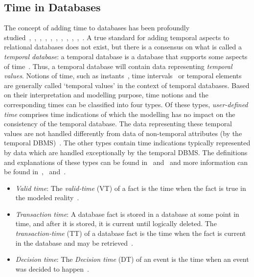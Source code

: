 %
%




\subsection{\label{subsec:time-in-databases}Time in Databases}
The concept of adding time to databases has been profoundly studied~\cite{Darwen1998},~\cite{Etzion1998},~\cite{Etzion1998b},~\cite{Gal1998},~\cite{Jensen1999},~\cite{Lomet2006},~\cite{Nascimento1995},~\cite{Sarda1990},~\cite{Snodgrass1998},~\cite{Toman1998},~\cite{Wu1998}. A true standard for adding temporal aspects to relational databases does not exist, but there is a consensus on what is called a \emph{temporal database}: a temporal database is a database that supports some aspects of time~\cite{Dyreson1994}. Thus, a temporal database will contain data representing \emph{temporal values}. Notions of time, such as instants~\cite{Dyreson1994}, time intervals~\cite{Dyreson1994} or temporal elements~\cite{Dyreson1994} are generally called `temporal values' in the context of temporal databases. Based on their interpretation and modelling purpose, time notions and the corresponding times can be classified into four types. Of these types, \emph{user-defined time} comprises time indications of which the modelling has no impact on the consistency of the temporal database. The data representing these temporal values are not handled differently from data of non-temporal attributes (by the temporal DBMS)~\cite{Dyreson1994}. The other types contain time indications typically represented by data which are handled exceptionally by the temporal DBMS. The definitions and explanations of these types can be found in~\cite{Dyreson1994} and~\cite{Nascimento1995} and more information can be found in~\cite{Jensen1991},~\cite{Snodgrass1984} and~\cite{Nascimento1995}.

\begin{itemize}
	\item \emph{Valid time}: The \emph{valid-time} (VT) of a fact is the time when the fact is true in the modeled reality~\cite{Dyreson1994}.
	\item \emph{Transaction time}: A database fact is stored in a database at some point in time, and after it is stored, it is current until logically deleted. The \emph{transaction-time} (TT) of a database fact is the time when the fact is current in the database and may be retrieved~\cite{Dyreson1994}.
	\item \emph{Decision time}: The \emph{Decision time} (DT) of an event is the time when an event was decided to happen~\cite{Nascimento1995}.
\end{itemize}

